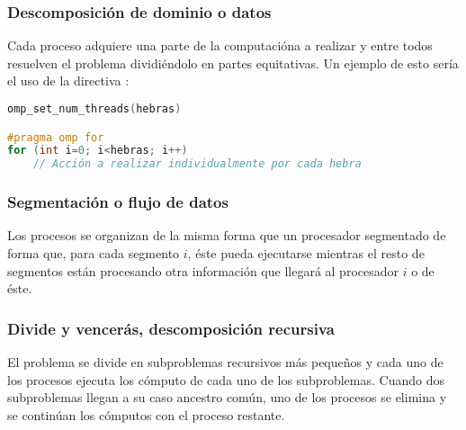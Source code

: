\subsubsection{Descomposición de dominio o datos}

Cada proceso adquiere una parte de la computacióna a realizar y entre todos resuelven el problema dividiéndolo en partes equitativas.
Un ejemplo de esto sería el uso de la directiva :

\begin{lstlisting}[language=C]
omp_set_num_threads(hebras)

#pragma omp for
for (int i=0; i<hebras; i++)
	// Acción a realizar individualmente por cada hebra
\end{lstlisting}

\subsubsection{Segmentación o flujo de datos}

Los procesos se organizan de la misma forma que un procesador segmentado de forma que, para cada segmento $i$, éste pueda ejecutarse mientras el resto de segmentos están procesando otra información que llegará al procesador $i$ o de éste.

\subsubsection{Divide y vencerás, descomposición recursiva}

El problema se divide en subproblemas recursivos más pequeños y cada uno de los procesos ejecuta los cómputo de cada uno de los subproblemas.
Cuando dos subproblemas llegan a su caso ancestro común, uno de los procesos se elimina y se continúan los cómputos con el proceso restante.
